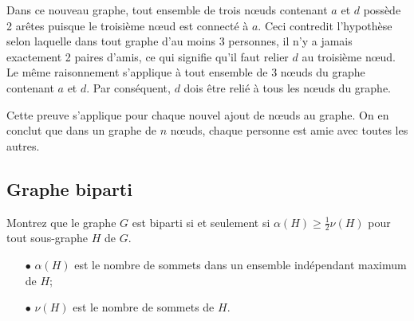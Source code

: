 \begin{solution}
Dans ce nouveau graphe, tout ensemble de trois nœuds contenant $a$ et $d$ possède 2 arêtes puisque le troisième nœud est connecté à $a$. Ceci contredit l'hypothèse selon laquelle dans tout graphe d'au moins 3 personnes, il n'y a jamais exactement 2 paires d'amis, ce qui signifie qu'il faut relier $d$ au troisième nœud. Le même raisonnement s'applique à tout ensemble de 3 nœuds du graphe contenant $a$ et $d$. Par conséquent, $d$ dois être relié à tous les nœuds du graphe.

\begin{center}
\end{center}

Cette preuve s'applique pour chaque nouvel ajout de nœuds au graphe. On en conclut que dans un graphe de $n$ nœuds, chaque personne est amie avec toutes les autres.
\end{solution}

\subsection{Graphe biparti}
Montrez que le graphe $G$ est biparti si et seulement si $\alpha(H) \geq \frac{1}{2} \nu(H)$ pour tout sous-graphe $H$ de $G$.

\begin{enumerate}
  \item[$\bullet$] $\alpha(H)$ est le nombre de sommets dans un ensemble indépendant maximum de $H$;
  \item[$\bullet$] $\nu(H)$ est le nombre de sommets de $H$.
\end{enumerate}

